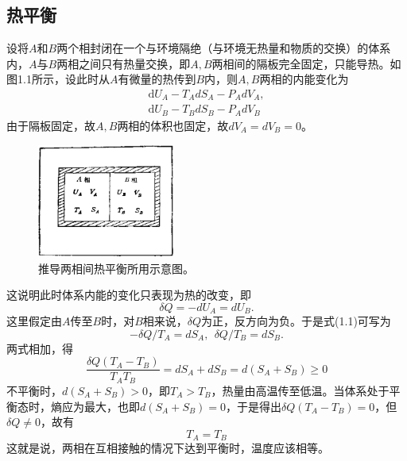 ﻿\subsection{热平衡}
设将$A$和$B$两个相封闭在一个与环境隔绝（与环境无热量和物质的交换）的体系内，$A$与$B$两相之间只有热量交换，即$A,B$两相间的隔板完全固定，只能导热。如图1.1所示，设此时从$A$有微量的热传到$B$内，则$A,B$两相的内能变化为
\begin{equation}
\begin{aligned}
\mathrm{d}U_A-T_AdS_A-P_AdV_A, \\
\mathrm{d}U_B-T_BdS_B-P_AdV_B
\end{aligned}
\end{equation}
由于隔板固定，故$A,B$两相的体积也固定，故$dV_A=dV_B=0$。
\begin{figure}[h]
 \centering
 \includegraphics[width=0.4\textwidth]{fig/cp01/img1.1.jpg}
 \caption{推导两相间热平衡所用示意图。}
\end{figure}
这说明此时体系内能的变化只表现为热的改变，即
$$\delta Q=-dU_A=dU_B.$$
这里假定由$A$传至$B$时，对$B$相来说，$\delta Q$为正，反方向为负。于是式(1.1)可写为
\begin{equation}
-\delta Q/T_A=dS_A,\ \ \delta Q/T_B=dS_B.
\end{equation}
两式相加，得
$$\frac{\delta Q(T_A-T_B)}{T_AT_B}=dS_A+dS_B=d(S_A+S_B)\geq 0$$
不平衡时，$d(S_A+S_B)>0$，即$T_A>T_B$，热量由高温传至低温。当体系处于平衡态时，熵应为最大，也即$d(S_A+S_B)=0$，于是得出$\delta Q(T_A-T_B)=0$，但$\delta Q\neq 0$，故有
\begin{equation}T_A=T_B\end{equation}
这就是说，两相在互相接触的情况下达到平衡时，温度应该相等。